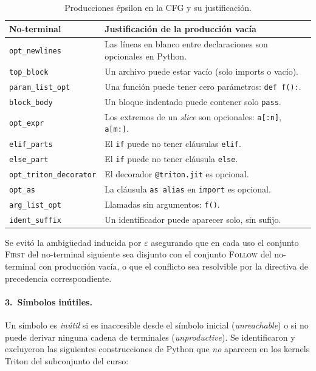 \begin{table}[H]
\centering
\caption{Producciones épsilon en la CFG y su justificación.}
\label{tab:epsilon}
\begin{tabular}{@{}lp{9cm}@{}}
\toprule
\textbf{No-terminal} & \textbf{Justificación de la producción vacía} \\
\midrule
\texttt{opt\_newlines}   & Las líneas en blanco entre declaraciones son opcionales en Python. \\
\texttt{top\_block}      & Un archivo puede estar vacío (solo imports o vacío). \\
\texttt{param\_list\_opt}& Una función puede tener cero parámetros: \texttt{def f():}. \\
\texttt{block\_body}     & Un bloque indentado puede contener solo \texttt{pass}. \\
\texttt{opt\_expr}       & Los extremos de un \textit{slice} son opcionales: \texttt{a[:n]}, \texttt{a[m:]}. \\
\texttt{elif\_parts}     & El \texttt{if} puede no tener cláusulas \texttt{elif}. \\
\texttt{else\_part}      & El \texttt{if} puede no tener cláusula \texttt{else}. \\
\texttt{opt\_triton\_decorator} & El decorador \texttt{@triton.jit} es opcional. \\
\texttt{opt\_as}         & La cláusula \texttt{as alias} en \texttt{import} es opcional. \\
\texttt{arg\_list\_opt}  & Llamadas sin argumentos: \texttt{f()}. \\
\texttt{ident\_suffix}   & Un identificador puede aparecer solo, sin sufijo. \\
\bottomrule
\end{tabular}
\end{table}

Se evitó la ambigüedad inducida por $\varepsilon$ asegurando que en cada uso
el conjunto \textsc{First} del no-terminal siguiente sea disjunto con el
conjunto \textsc{Follow} del no-terminal con producción vacía, o que el
conflicto sea resolvible por la directiva de precedencia correspondiente.

\paragraph{3.\ Símbolos inútiles.}
Un símbolo es \textit{inútil} si es inaccesible desde el símbolo inicial
(\textit{unreachable}) o si no puede derivar ninguna cadena de terminales
(\textit{unproductive}). Se identificaron y excluyeron las siguientes
construcciones de Python que \emph{no} aparecen en los kernels Triton del
subconjunto del curso:

